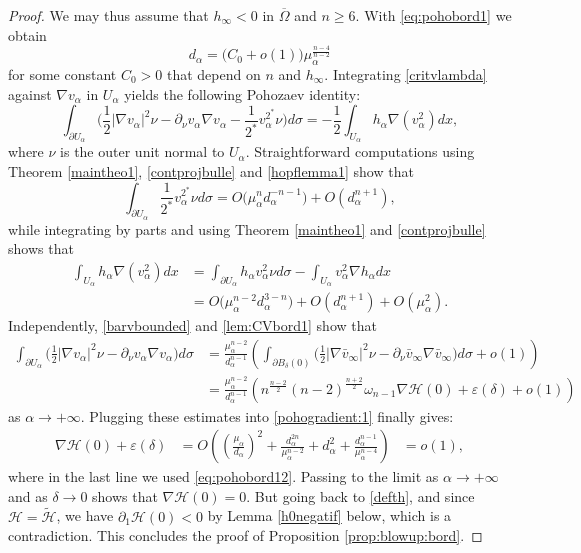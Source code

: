 \documentclass[10pt]{amsart}
\numberwithin{equation}{section}
\newcommand{\ve}{\varepsilon}
\newcommand{\Om}{\Omega}
\newcommand{\ma}{\mu_\alpha}
\def \ma{\mu_{\alpha}}
\def \h{\mathcal{H}}
\def \th{\widetilde{\mathcal{H}}}
\def \da{d_{\alpha}}
\theoremstyle{plain}
\theoremstyle{remark}
\begin{document}
\begin{proof}
We may thus assume that $h_\infty < 0$ in $\overline{\Om}$ and $n \ge 6$. With \eqref{eq:pohobord1} we obtain 
\begin{equation} \label{eq:pohobord12}
d_\alpha = \big( C_0 + o(1) \big) \ma^{\frac{n-4}{n-2}}
\end{equation}
for some constant $C_0 >0$ that depend on $n$ and $h_\infty$. Integrating \eqref{critvlambda} against $\nabla v_\alpha$ in $U_\alpha$ yields the following Pohozaev identity:
\begin{equation} \label{pohogradient:1}
\int_{\partial U_\alpha} \Big( \frac12 |\nabla v_\alpha|^2 \nu - \partial_{\nu} v_\alpha \nabla v_\alpha - \frac{1}{2^*} v_{\alpha}^{2^*} \nu \Big) d \sigma  = - \frac12 \int_{U_\alpha} h_\alpha \nabla( v_\alpha^2) dx,
\end{equation}
where $\nu$ is the outer unit normal to $U_\alpha$. Straightforward computations using Theorem \ref{maintheo1}, \eqref{contprojbulle} and \eqref{hopflemma1} show that 
$$ \int_{\partial U_\alpha}  \frac{1}{2^*} v_{\alpha}^{2^*} \nu  d \sigma=  O \big( \ma^n \da^{-n-1}\big) + O(d_\alpha^{n+1}),$$
while  integrating by parts and using Theorem \ref{maintheo1} and \eqref{contprojbulle} shows that 
$$ \begin{aligned}
\int_{U_\alpha} h_\alpha \nabla( v_\alpha^2) dx &= \int_{\partial U_\alpha} h_\alpha v_\alpha^2 \nu d \sigma - \int_{U_\alpha} v_\alpha^2 \nabla h_\alpha dx \\
& = O \big( \ma^{n-2} \da^{3-n}\big) + O(d_\alpha^{n+1}) + O (\ma^2) . 
\end{aligned} $$
Independently, \eqref{barvbounded} and \eqref{lem:CVbord1} show that 
$$ \begin{aligned} \int_{\partial U_\alpha} \Big( \frac12 |\nabla v_\alpha|^2 \nu - \partial_{\nu} v_\alpha \nabla v_\alpha  \Big) d \sigma & = \frac{\ma^{n-2}}{\da^{n-1}} \left(  \int_{\partial B_\delta(0)} \Big( \frac12 |\nabla \bar{v}_\infty|^2 \nu - \partial_{\nu} \bar{v}_\infty \nabla \bar{v}_\infty  \Big) d \sigma  + o(1) \right)  \\
& =  \frac{\ma^{n-2}}{\da^{n-1}} \left(  n^{\frac{n-2}{2}} (n-2)^{\frac{n+2}{2}} \omega_{n-1} \nabla \h(0) + \ve(\delta)  + o(1) \right)
\end{aligned}   $$ 
as $ \alpha \to + \infty$. Plugging these estimates into \eqref{pohogradient:1} finally gives: 
$$ \begin{aligned} \nabla \h(0) + \ve(\delta) & = O \left( \left( \frac{\ma}{\da} \right)^2  + \frac{d_\alpha^{2n} }{\ma^{n-2}} + \da^2 + \frac{d_\alpha^{n-1}}{\ma^{n-4}}\right) 
& = o(1),
\end{aligned} $$ 
where in the last line we used \eqref{eq:pohobord12}. Passing to the limit as $\alpha \to + \infty$ and as $\delta \to 0$ shows that $\nabla \h(0) = 0$. But going back to \eqref{defth}, and since $\h = \th$, we have $\partial_1 \h(0) < 0$ by Lemma \ref{h0negatif} below, which is a contradiction. This concludes the proof of Proposition \ref{prop:blowup:bord}. 
\end{proof}
\end{document}
